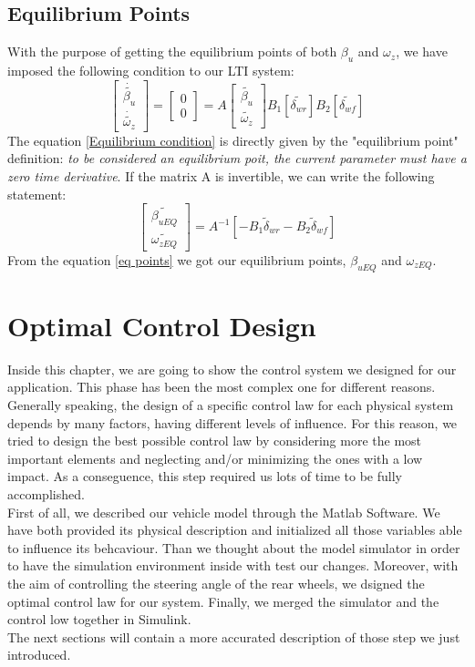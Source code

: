 \documentclass[a4paper,12pt,titlepage]{report}
\begin{document}
\section{Equilibrium Points}
	With the purpose of getting the equilibrium points of both $\beta_{u}$ and $\omega_{z}$, we have imposed the following condition to our LTI system:
		\begin{equation} \label{Equilibrium condition}
			\begin{bmatrix}
				\dot{\tilde{\beta_{u}}} \\
				\dot{\tilde{\omega_{z}}}
			\end{bmatrix} =
			\begin{bmatrix}
				0 \\
				0
			\end{bmatrix} = A
			\begin{bmatrix}
				\tilde{\beta_{u}} \\
				\tilde{\omega_{z}}
			\end{bmatrix} 
			B_{1}[\tilde{\delta_{wr}}] B_{2}[\tilde{\delta_{wf}}]
		\end{equation}
	The equation \ref{Equilibrium condition} is directly given by the "equilibrium point" definition: \textit{to be considered an equilibrium poit, the current parameter must have a zero time derivative}. If the matrix A is invertible, we can write the following statement:
		\begin{equation} \label{eq points}
			\begin{bmatrix}
				\tilde{\beta_{uEQ}} \\
				\tilde{\omega_{zEQ}}
			\end{bmatrix} = 
			A^{-1}[-B_{1} \tilde\delta_{wr} - B_{2} \tilde\delta_{wf}]
		\end{equation}
	From the equation \ref{eq points} we got our equilibrium points, $\beta_{uEQ}$ and $\omega_{zEQ}$.
\chapter{Optimal Control Design}
	Inside this chapter, we are going to show the control system we designed for our application. This phase has been the most complex one for different reasons. Generally speaking, the design of a specific control law for each physical system depends by many factors, having different levels of influence. For this reason, we tried to design the best possible control law by considering more the most important elements and neglecting and/or minimizing the ones with a low impact. As a conseguence, this step required us lots of time to be fully accomplished.\\
	First of all, we described our vehicle model through the Matlab Software. We have both provided its physical description and initialized all those variables able to influence its behcaviour. Than we thought about the model simulator in order to have the simulation environment inside with test our changes. Moreover, with the aim of controlling the steering angle of the rear wheels, we dsigned the optimal control law for our system. Finally, we merged the simulator and the control low together in Simulink. \\
	The next sections will contain a more accurated description of those step we just introduced.
\end{document}
